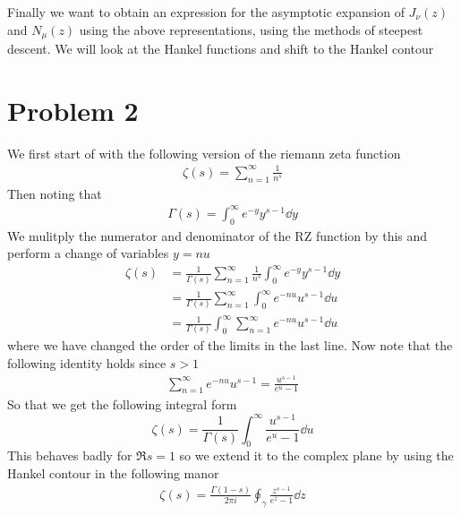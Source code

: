 \documentclass[a4paper,12pt]{article}
\begin{document}
Finally we want to obtain an expression for the asymptotic expansion of $J_\nu(z)$ and $N_\mu(z)$ using the above representations, using the methods of steepest descent. We will look at the Hankel functions and shift to the Hankel contour

\section*{Problem 2}
We first start of with the following version of the riemann zeta function
\begin{equation}
	\begin{aligned}
		\zeta (s)=\sum_{n=1}^{\infty}\frac{1}{n^s}
	\end{aligned}
\end{equation}
Then noting that
\begin{equation}
	\begin{aligned}
		\Gamma(s)=\int_{0}^{\infty}e^{-y}y^{s-1}\dd y
	\end{aligned}
\end{equation}
We mulitply the numerator and denominator of the RZ function by this and perform a change of variables $y= nu$
\begin{equation}
	\begin{aligned}
		\zeta (s)&=\frac{1}{\Gamma(s)}\sum_{n=1}^{\infty}\frac{1}{n^s}\int_{0}^{\infty}e^{-y}y^{s-1}\dd y\\
		&=\frac{1}{\Gamma(s)}\sum_{n=1}^{\infty}\int_{0}^{\infty}e^{-nu}u^{s-1}\dd u\\
		&=\frac{1}{\Gamma(s)}\int_{0}^{\infty}\sum_{n=1}^{\infty}e^{-nu}u^{s-1}\dd u
	\end{aligned}
\end{equation}
where we have changed the order of the limits in the last line. Now note that the following identity holds since $s>1$
\begin{equation}
	\begin{aligned}
		\sum_{n=1}^{\infty} e^{-nu}u^{s-1}= \frac{u^{s-1}}{e^{u}-1}
	\end{aligned}
\end{equation}
So that we get the following integral form
\begin{equation}\label{eq:gammafunc}
\zeta(s)=\frac{1}{\Gamma(s)}\int_0^\infty \frac{u^{s-1}}{e^{u}-1}\dd u
\end{equation}
This behaves badly for $\Re s=1$ so we extend it to the complex plane by using the Hankel contour in the following manor
\begin{equation}
	\begin{aligned}
		\zeta(s)=\frac{\Gamma(1-s)}{2\pi i}\oint_\gamma \frac{z^{s-1}}{e^{z}-1} \dd z
	\end{aligned}
\end{equation}
\end{document}
